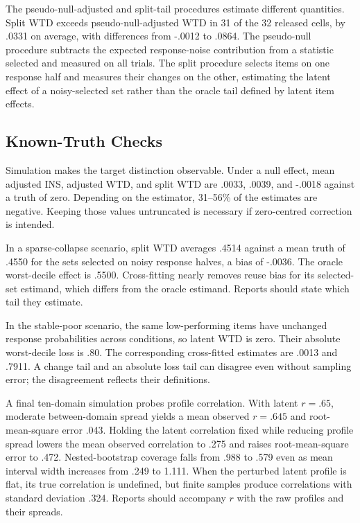 \documentclass[12pt]{article}
\begin{document}
The pseudo-null-adjusted and split-tail procedures estimate different quantities. Split WTD exceeds pseudo-null-adjusted WTD in 31 of the 32 released cells, by .0331 on average, with differences from -.0012 to .0864. The pseudo-null procedure subtracts the expected response-noise contribution from a statistic selected and measured on all trials. The split procedure selects items on one response half and measures their changes on the other, estimating the latent effect of a noisy-selected set rather than the oracle tail defined by latent item effects.

\subsection{Known-Truth Checks}\label{ssec:known_truth}

Simulation makes the target distinction observable. Under a null effect, mean adjusted INS, adjusted WTD, and split WTD are .0033, .0039, and -.0018 against a truth of zero. Depending on the estimator, 31--56\% of the estimates are negative. Keeping those values untruncated is necessary if zero-centred correction is intended.

In a sparse-collapse scenario, split WTD averages .4514 against a mean truth of .4550 for the sets selected on noisy response halves, a bias of -.0036. The oracle worst-decile effect is .5500. Cross-fitting nearly removes reuse bias for its selected-set estimand, which differs from the oracle estimand. Reports should state which tail they estimate.

In the stable-poor scenario, the same low-performing items have unchanged response probabilities across conditions, so latent WTD is zero. Their absolute worst-decile loss is .80. The corresponding cross-fitted estimates are .0013 and .7911. A change tail and an absolute loss tail can disagree even without sampling error; the disagreement reflects their definitions.

A final ten-domain simulation probes profile correlation. With latent \(r=.65\), moderate between-domain spread yields a mean observed \(r=.645\) and root-mean-square error .043. Holding the latent correlation fixed while reducing profile spread lowers the mean observed correlation to .275 and raises root-mean-square error to .472. Nested-bootstrap coverage falls from .988 to .579 even as mean interval width increases from .249 to 1.111. When the perturbed latent profile is flat, its true correlation is undefined, but finite samples produce correlations with standard deviation .324. Reports should accompany \(r\) with the raw profiles and their spreads.
\end{document}
